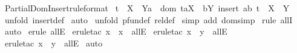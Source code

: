 \begin{isabellebody}
\isamarkupfalse%
%
\endisatagproof
{\isafoldproof}%
%
\isadelimproof
\isanewline
%
\endisadelimproof
\isanewline
\isanewline
{}\isamarkupfalse%
\ Partial{\isacharunderscore}Dom{\isacharunderscore}Insert{\isacharbrackleft}rule{\isacharunderscore}format{\isacharbrackright}{\isacharcolon}\ \isanewline
{\isachardoublequoteopen}t\ {\isacharcolon}\ {\isacharparenleft}X\ {\isacharminus}{\isacharbar}{\isacharminus}{\isachargreater}\ Y{\isacharparenright}{\isacharminus}{\isacharminus}{\isachargreater}a\ {\isachartilde}{\isacharcolon}\ dom\ t{\isacharminus}{\isacharminus}{\isachargreater}a{\isacharcolon}X\ {\isacharminus}{\isacharminus}{\isachargreater}\ b{\isacharcolon}Y{\isacharminus}{\isacharminus}{\isachargreater}\ insert\ {\isacharparenleft}a{\isacharcomma}b{\isacharparenright}\ t\ {\isacharcolon}\ {\isacharparenleft}X\ {\isacharminus}{\isacharbar}{\isacharminus}{\isachargreater}\ Y{\isacharparenright}{\isachardoublequoteclose}\isanewline
%
\isadelimproof
%
\endisadelimproof
%
\isatagproof
{}\isamarkupfalse%
\ {\isacharparenleft}unfold\ insert{\isacharunderscore}def{\isacharparenright}\isanewline
{}\isamarkupfalse%
\ auto\isanewline
{}\isamarkupfalse%
\ {\isacharparenleft}unfold\ pfun{\isacharunderscore}def\ rel{\isacharunderscore}def{\isacharparenright}\isanewline
{}\isamarkupfalse%
\ {\isacharparenleft}simp\ add{\isacharcolon}\ dom{\isacharunderscore}simp{\isacharparenright}\isanewline
{}\isamarkupfalse%
\ {\isacharparenleft}rule\ allI{\isacharparenright}{\isacharplus}\isanewline
{}\isamarkupfalse%
\ auto\isanewline
{}\isamarkupfalse%
\ {\isacharparenleft}erule\ allE{\isacharparenright}\isanewline
{}\isamarkupfalse%
\ {\isacharparenleft}erule{\isacharunderscore}tac\ x\ {\isacharequal}\ {\isachardoublequoteopen}x{\isachardoublequoteclose}\ \ allE{\isacharparenright}\isanewline
{}\isamarkupfalse%
\ {\isacharparenleft}erule{\isacharunderscore}tac\ x\ {\isacharequal}\ {\isachardoublequoteopen}y{}{\isachardoublequoteclose}\ \ allE{\isacharparenright}\isanewline
{}\isamarkupfalse%
\ {\isacharparenleft}erule{\isacharunderscore}tac\ x\ {\isacharequal}\ {\isachardoublequoteopen}y{}{\isachardoublequoteclose}\ \ allE{\isacharparenright}\isanewline
{}\isamarkupfalse%
\ auto\isanewline
{}\isamarkupfalse%
%
\endisatagproof
{\isafoldproof}%
%
\isadelimproof
\isanewline
%
\endisadelimproof

\end{isabellebody}
